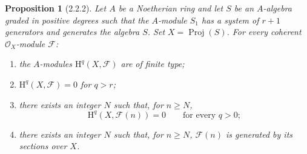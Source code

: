 \documentclass[oneside]{amsart}
\theoremstyle{ega-env-style}
\theoremstyle{ega-thm-env-style}
\newtheorem*{proposition}{Proposition}
\theoremstyle{ega-defn-env-style}
\def\mathcal{\mathscr}
\def\sh{\mathcal}                   %
\def\geq{\geqslant}                 %
\def\HH{\mathrm{H}}                 %
\def\Proj{\operatorname{Proj}}
\let\EGAOriginalLabel\label
\renewcommand{\label}[1]{\phantomsection\EGAOriginalLabel{#1}}
\begin{document}
\begin{proposition}[2.2.2]
\label{III.2.2.2}
Let $A$ be a Noetherian ring and let $S$ be an $A$-algebra graded in positive degrees such that the $A$-module $S_1$ has a system of $r+1$ generators and generates the algebra $S$.
Set $X=\Proj(S)$.
For every coherent $\sh{O}_X$-module $\sh{F}$:
\begin{enumerate}
  \item[{\rm(i)}] the $A$-modules $\HH^q(X,\sh{F})$ are of finite type;
  \item[{\rm(ii)}] $\HH^q(X,\sh{F})=0$ for $q>r$;
  \item[{\rm(iii)}] there exists an integer $N$ such that, for $n\geq N$,
  \[
    \HH^q(X,\sh{F}(n))=0
    \qquad\text{for every }q>0;
  \]
  \item[{\rm(iv)}] there exists an integer $N$ such that, for $n\geq N$, $\sh{F}(n)$ is generated by its sections over $X$.
\end{enumerate}
\end{proposition}
\end{document}
